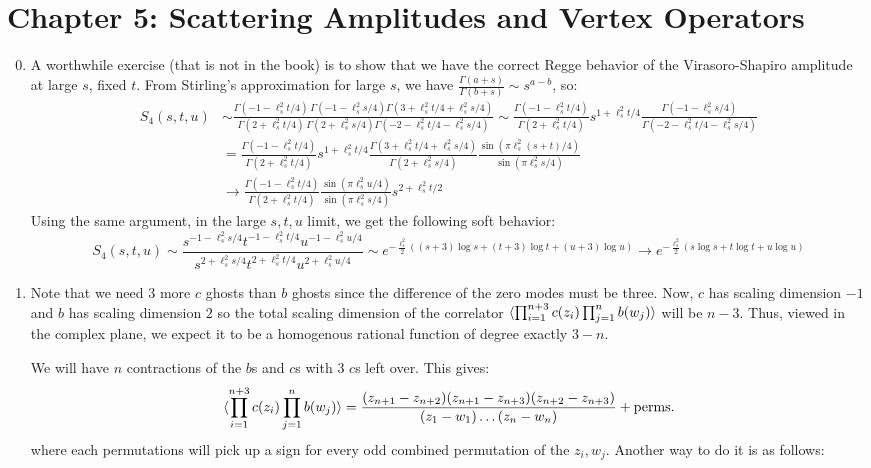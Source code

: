 \documentclass[11pt, class=article, crop=false]{standalone}
\begin{document}
\section*{Chapter 5: Scattering Amplitudes and Vertex Operators} %
\label{sec:chapter_5_scattering_amplitudes_and_vertex_operators}
\begin{enumerate}
	\setcounter{enumi}{-1}
	\item A worthwhile exercise (that is not in the book) is to show that we have the correct Regge behavior of the Virasoro-Shapiro amplitude at large $s$, fixed $t$. From Stirling's approximation for large $s$, we have $\frac{\Gamma(a + s)}{\Gamma(b + s)} \sim s^{a-b}$, so:
	\[
	\begin{aligned}
		S_{4} (s, t, u) &\sim %
		  \frac{\Gamma(-1 - \ell_s^2 t/4) \, \Gamma(-1 - \ell_s^2 s/4)\Gamma(3 + \ell_s^2 t/4 + \ell_s^2 s/4)}{\Gamma(2 + \ell_s^2 t/4) \, \Gamma(2 + \ell_s^2 s/4)  \Gamma(-2-\ell_s^2 t/ 4 - \ell_s^2 s/4)} \sim \frac{\Gamma(-1 - \ell_s^2 t/4)}{\Gamma(2 + \ell_s^2 t/4)} s^{1 + \ell_s^2 t/4} \frac{\Gamma(-1 - \ell_s^2 s/4)}{\Gamma(-2 -\ell_s^2 t/4 - \ell_s^2 s/4)}\\
		  & = \frac{\Gamma(-1 - \ell_s^2 t/4)}{\Gamma(2 + \ell_s^2 t/4)} s^{1 + \ell_s^2 t/4} \frac{\Gamma(3 +\ell_s^2 t/4 + \ell_s^2 s/4)}{\Gamma(2 + \ell_s^2 s/4)} \frac{\sin(\pi \ell_s^2 (s + t)/4)}{\sin(\pi \ell_s^2 s/ 4)} \\
		  & \to \frac{\Gamma(-1 - \ell_s^2 t/4)}{\Gamma(2 + \ell_s^2 t/4)}  \frac{\sin(\pi \ell_s^2 u/4)}{\sin(\pi \ell_s^2 s/ 4)} s^{2 + \ell_s^2 t/2}
	\end{aligned}
	\]
	Using the same argument, in the large $s, t, u$ limit, we get the following soft behavior: 
	\[
		S_4(s, t, u) \sim \frac{s^{-1-\ell_s^2 s/4} t^{-1 - \ell_s^2 t/4} u^{-1-\ell_s^2 u/4}}{s^{2+\ell_s^2 s/4} t^{2 + \ell_s^2 t/4} u^{2+\ell_s^2 u/4}} \sim e^{-\frac{\ell_s^2}{2}((s+3) \log s + (t+3) \log t + (u+3) \log u)} \to e^{-\frac{\ell_s^2}{2} (s \log s + t \log t + u\log u)}
	\]
	\item
	Note that we need 3 more $c$ ghosts than $b$ ghosts since the difference of the zero modes must be three. Now, $c$ has scaling dimension $-1$ and $b$ has scaling dimension $2$ so the total scaling dimension of the correlator $\braket{\prod_{i=1}^{n+3} c(z_i) \prod_{j=1}^n b(w_j)}$ will be $n-3$. Thus, viewed in the complex plane, we expect it to be a homogenous rational function of degree exactly $3-n$.
	
	 We will have $n$ contractions of the $b$s and $c$s with $3$ $c$s left over. This gives:
	\[
		\braket{\prod_{i=1}^{n+3} c(z_i) \prod_{j=1}^n b(w_j)} = \frac{(z_{n+1} - z_{n+2}) (z_{n+1} - z_{n+3}) (z_{n+2} - z_{n+3})}{(z_1 - w_1) \dots (z_n - w_n)} + \text{perms.}
	\]
	where each permutations will pick up a sign for every odd combined permutation of the $z_i, w_j$.
	Another way to do it is as follows: 
	

\end{enumerate}
\end{document}
